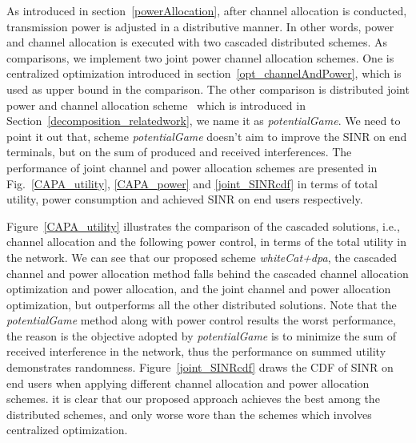 \documentclass[times]{ettauth}
\newcommand{\ie}{i.e., }
\theoremstyle{mytheoremstyle}
\theoremstyle{mytheoremstyle}
\theoremstyle{mytheoremstyle}
\begin{document}
As introduced in section~\ref{powerAllocation}, after channel allocation is conducted, transmission power is adjusted in a distributive manner.
In other words, power and channel allocation is executed with two cascaded distributed schemes.
As comparisons, we implement two joint power channel allocation schemes.
One is centralized optimization introduced in section~\ref{opt_channelAndPower}, which is used as upper bound in the comparison.
The other comparison is distributed joint power and channel allocation scheme~\cite{pimrc_2012} which is introduced in Section~\ref{decomposition_relatedwork}, we name it as \textit{potentialGame}.
We need to point it out that, scheme \textit{potentialGame} doesn't aim to improve the SINR on end terminals, but on the sum of produced and received interferences.
The performance of joint channel and power allocation schemes are presented in Fig.~\ref{CAPA_utility}, \ref{CAPA_power} and \ref{joint_SINRcdf} in terms of total utility, power consumption and achieved SINR on end users respectively.

Figure~\ref{CAPA_utility} illustrates the comparison of the cascaded solutions, \ie channel allocation and the following power control, in terms of the total utility in the network.
We can see that our proposed scheme \textit{whiteCat+dpa}, the cascaded channel and power allocation method falls behind the cascaded channel allocation optimization and power allocation, and the joint channel and power allocation optimization, but outperforms all the other distributed solutions.
Note that the \textit{potentialGame} method along with power control results the worst performance, the reason is the objective adopted by \textit{potentialGame} is to minimize the sum of received interference in the network, thus the performance on summed utility demonstrates randomness.
Figure~\ref{joint_SINRcdf} draws the CDF of SINR on end users when applying different channel allocation and power allocation schemes.
it is clear that our proposed approach achieves the best among the distributed schemes, and only worse wore than the schemes which involves centralized optimization.
\end{document}
